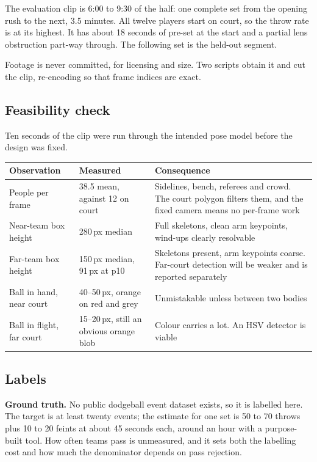 \documentclass[10pt,a4paper]{article}
\begin{document}
The evaluation clip is 6:00 to 9:30 of the half: one complete set from the opening rush to
the next, 3.5 minutes. All twelve players start on court, so the throw rate is at its
highest. It has about 18 seconds of pre-set at the start and a partial lens obstruction part-way
through. The following set is the held-out segment.

Footage is never committed, for licensing and size. Two scripts obtain it and cut the clip,
re-encoding so that frame indices are exact.

\subsection{Feasibility check}
\label{sec:feas}

Ten seconds of the clip were run through the intended pose model before the design was
fixed.

{\footnotesize
\begin{xltabular}{\textwidth}{L{44mm} L{28mm} X}
\toprule
\textbf{Observation} & \textbf{Measured} & \textbf{Consequence}\\
\midrule
People per frame & 38.5 mean, against 12 on court & Sidelines, bench, referees and crowd. The court polygon filters them, and the fixed camera means no per-frame work\\
Near-team box height & 280\,px median & Full skeletons, clean arm keypoints, wind-ups clearly resolvable\\
Far-team box height & 150\,px median, 91\,px at p10 & Skeletons present, arm keypoints coarse. Far-court detection will be weaker and is reported separately\\
Ball in hand, near court & 40--50\,px, orange on red and grey & Unmistakable unless between two bodies\\
Ball in flight, far court & 15--20\,px, still an obvious orange blob & Colour carries a lot. An HSV detector is viable\\
\bottomrule
\end{xltabular}}

\subsection{Labels}
\label{sub:labels}

\textbf{Ground truth.} No public dodgeball event dataset exists, so it is labelled here. The target is
at least twenty events; the estimate for one set is 50 to 70 throws plus 10 to 20 feints at
about 45 seconds each, around an hour with a purpose-built tool. How often teams pass is
unmeasured, and it sets both the labelling cost and how much the denominator depends on pass
rejection.
\end{document}
